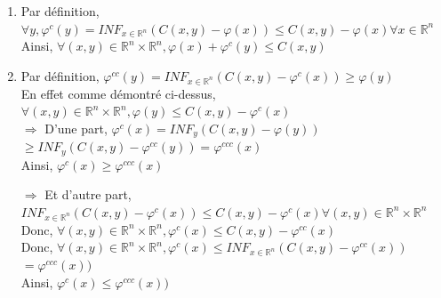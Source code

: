 \documentclass{report}
\begin{document}
\begin{myproof}
    \begin{enumerate}
        \item 
            Par définition, $\forall y, \varphi^{c}(y) = INF_{x \in \mathbb{R}^{n}} (C(x,y) - \varphi(x)) \le C(x,y) - \varphi(x) \forall x \in \mathbb{R}^{n}$\\
            Ainsi, $\forall(x,y) \in \mathbb{R}^{n} \times \mathbb{R}^{n}, \varphi(x) + \varphi^{c}(y) \le C(x,y)$\\

        \item 
            Par définition, $\varphi^{cc}(y) = INF_{x \in \mathbb{R}^{n}} (C(x,y) - \varphi^{c}(x)) \ge \varphi(y)$\\
            En effet comme démontré ci-dessus, $\forall (x,y)\in \mathbb{R}^{n} \times \mathbb{R}^{n},\varphi(y) \le C(x,y) - \varphi^{c}(x)$\\

            $\Rightarrow$
            D'une part, $\varphi^{c}(x) = INF_{y} (C(x,y) - \varphi(y))$
            $\ge INF_{y} (C(x,y) - \varphi^{cc}(y)) = \varphi^{ccc}(x)$\\
            \boldmath
            Ainsi, $\varphi^{c}(x) \ge \varphi^{ccc}(x)$
            \unboldmath

            $\Rightarrow$
            Et d'autre part, $INF_{x \in \mathbb{R}^{n}} (C(x,y) - \varphi^{c}(x)) \le C(x,y) - \varphi^{c}(x) \forall (x,y)\in \mathbb{R}^{n} \times \mathbb{R}^{n}$\\
            Donc, $\forall (x,y)\in \mathbb{R}^{n} \times \mathbb{R}^{n}, \varphi^{c}(x) \le C(x,y) - \varphi^{cc}(x)$\\
            Donc, $\forall (x,y)\in \mathbb{R}^{n} \times \mathbb{R}^{n}, \varphi^{c}(x) \le INF_{x \in \mathbb{R}^{n}} (C(x,y) - \varphi^{cc}(x))$
            $ = \varphi^{ccc}(x))$\\
            \boldmath
            Ainsi, $\varphi^{c}(x) \le \varphi^{ccc}(x))$\\
            \unboldmath


\end{enumerate}
\end{myproof}
\end{document}
